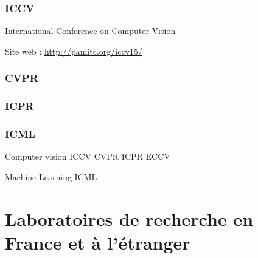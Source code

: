 \documentclass{beamer}
\begin{document}
\begin{frame}
\frametitle{ICCV}

International Conference on Computer Vision

Site web : \url{http://pamitc.org/iccv15/}

\end{frame}

\begin{frame}
\frametitle{CVPR}

\end{frame}

\begin{frame}
\frametitle{ICPR}

\end{frame}

\begin{frame}
\frametitle{ICML}


\end{frame}

\begin{frame}
Computer vision
ICCV
CVPR
ICPR
ECCV

Machine Learning
ICML
\end{frame}
\fi

\section{Laboratoires de recherche en France et à l'étranger}

\end{document}
